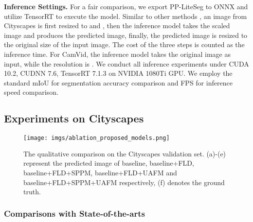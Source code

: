 \documentclass[10pt,twocolumn,letterpaper]{article}
\begin{document}
\noindent
\textbf{Inference Settings.}
For a fair comparison, we export PP-LiteSeg to ONNX and utilize TensorRT to execute the model.
Similar to other methods \cite{yu2021bisenet, fan2021rethinking}, an image from Cityscapes is first resized to  and , then the inference model takes the scaled image and produces the predicted image, finally, the predicted image is resized to the original size of the input image.
The cost of the three steps is counted as the inference time.
For CamVid, the inference model takes the original image as input, while the resolution is .
We conduct all inference experiments under CUDA 10.2, CUDNN 7.6, TensorRT 7.1.3 on NVIDIA 1080Ti GPU.
We employ the standard mIoU for segmentation accuracy comparison and FPS for inference speed comparison.


\subsection{Experiments on Cityscapes}

\begin{figure*}[t]
  \centering
   \texttt{[image: imgs/ablation\_proposed\_models.png]}
   \caption{The qualitative comparison on the Cityscapes validation set. (a)-(e) represent the predicted image of baseline, baseline+FLD, baseline+FLD+SPPM, baseline+FLD+UAFM and baseline+FLD+SPPM+UAFM respectively, (f) denotes the ground truth.}
   \label{fig:ablation_proposed_models}
\end{figure*}

\subsubsection{Comparisons with State-of-the-arts}
\end{document}
